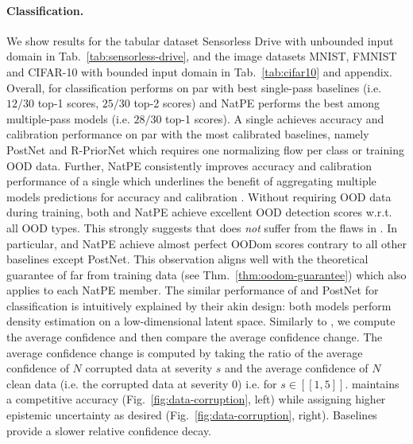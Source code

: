 \paragraph{Classification.} We show results for the tabular dataset Sensorless Drive with unbounded input domain in Tab.~\ref{tab:sensorless-drive}, and the image datasets MNIST, FMNIST and CIFAR-10 with bounded input domain in Tab.~\ref{tab:cifar10} and appendix. Overall, for classification \NatPNacro{} performs on par with best single-pass baselines (i.e. $12/30$ top-1 scores, $25/30$ top-2 scores) and NatPE performs the best among multiple-pass models (i.e. $28/30$ top-1 scores). A single \NatPNacro{} achieves accuracy and calibration performance on par with the most calibrated baselines, namely PostNet and R-PriorNet which requires one normalizing flow per class or training OOD data. Further, NatPE consistently improves accuracy and calibration performance of a single \NatPNacro{} which underlines the benefit of aggregating multiple models predictions for accuracy and calibration \citep{ensembles}. Without requiring OOD data during training, both \NatPNacro{} and NatPE achieve excellent OOD detection scores w.r.t. all OOD types. This strongly suggests that \NatPNacro{} does \emph{not} suffer from the flaws in \cite{anomaly-detection,deep-generative,typicality_OOD_generative}. In particular, \NatPNacro{} and NatPE achieve almost perfect OODom scores contrary to all other baselines except PostNet. This observation aligns well with the theoretical guarantee of \NatPNacro{} far from training data (see Thm.~\ref{thm:oodom-guarantee}) which also applies to each NatPE member. The similar performance of \NatPNacro{} and PostNet for classification is intuitively explained by their akin design: both models perform density estimation on a low-dimensional latent space. Similarly to \cite{charpentier2020}, we compute the average confidence  and then compare the average confidence change. The average confidence change is computed by taking the ratio of the average confidence of $N$ corrupted data at severity $s$ and the average confidence of $N$ clean data (i.e. the corrupted data at severity $0$) i.e.  for $s \in [\![ 1, 5 ]\!]$. \NatPNacro{} maintains a competitive accuracy (Fig.~\ref{fig:data-corruption}, left) while assigning higher epistemic uncertainty as desired (Fig.~\ref{fig:data-corruption}, right). Baselines provide a slower relative confidence decay.

